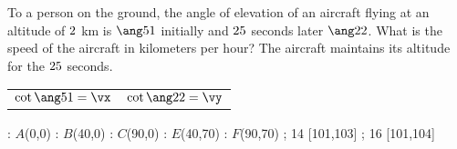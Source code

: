 

\DEGREESCOT\va\vm
\DEGREESCOT\vb\vn
\ROUND[2]\vm\vx
\ROUND[2]\vn\vy
\SUBTRACT\vn\vm\vz
\MULTIPLY\vh\vz\vd %
\ROUND[3]\vd\vj
\MULTIPLY{}\ve
\ROUND[2]\ve\vf
\DIVIDE\ve\vt\vr
\ROUND[2]\vr\vs

\question[3] To a person on the ground, the angle of elevation of an aircraft flying at an altitude of $2$ km 
is $\ang\va$ initially and $25$ seconds later $\ang\vb$. What is the speed of the
aircraft in kilometers per hour? The aircraft maintains its altitude for the $25$ seconds.

\watchout

\begin{calcaid}
  \begin{tabular}{c c}
    $\cot\ang\va=\vx$ & $\cot\ang\vb=\vy$ 
  \end{tabular}
\end{calcaid}

\ifprintanswers
  \vspace{0.7cm}
      : $A$(0,0)
      : $B$(40,0)
      : $C$(90,0)
      : $E$(40,70)
      : $F$(90,70)
    \figdrawbegin{}
      \figdrawline [100,101,102,104,103,100]
      \figdrawline [100,103]
      \figdrawline [100,104]
      \figdrawline [103,101]
       ; 14 [101,103] 
       ; 16 [101,104] 
    \figdrawend
    \centerline{\box\figBoxA}
\fi 

